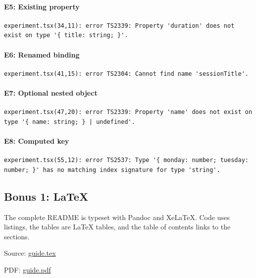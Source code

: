 \documentclass[
  11pt,
]{article}
\let\originalparagraph\paragraph
\renewcommand{\paragraph}[1]{\originalparagraph{#1}\mbox{}}
\begin{document}
\paragraph{E5: Existing property}\label{e5-existing-property}

\begin{lstlisting}
experiment.tsx(34,11): error TS2339: Property 'duration' does not exist on type '{ title: string; }'.
\end{lstlisting}

\paragraph{E6: Renamed binding}\label{e6-renamed-binding}

\begin{lstlisting}
experiment.tsx(41,15): error TS2304: Cannot find name 'sessionTitle'.
\end{lstlisting}

\paragraph{E7: Optional nested object}\label{e7-optional-nested-object}

\begin{lstlisting}
experiment.tsx(47,20): error TS2339: Property 'name' does not exist on type '{ name: string; } | undefined'.
\end{lstlisting}

\paragraph{E8: Computed key}\label{e8-computed-key}

\begin{lstlisting}
experiment.tsx(55,12): error TS2537: Type '{ monday: number; tuesday: number; }' has no matching index signature for type 'string'.
\end{lstlisting}

\subsection{Bonus 1: LaTeX}\label{bonus-1-latex}

The complete README is typeset with Pandoc and XeLaTeX. Code uses
listings, the tables are LaTeX tables, and the table of contents links
to the sections.

Source: \url{guide.tex}

PDF: \url{guide.pdf}
\end{document}
